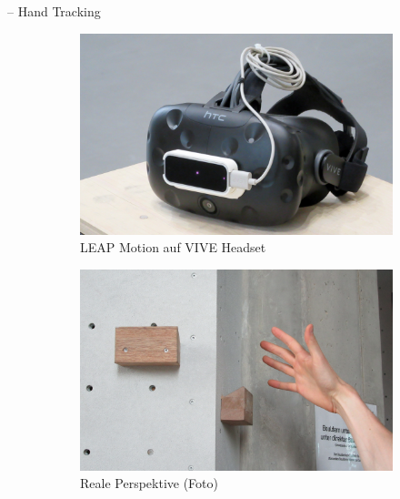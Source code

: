 \begin{frame}{\currentname{} -- Hand Tracking}
\begin{figure}
	\centering
	\begin{subfigure}[t]{0.32\textwidth}
		\centering
		\includegraphics[width=\textwidth]{include/images/leap-motion-overlay-setup.jpg}
		\caption{LEAP Motion auf VIVE Headset}
		\label{fig:leap-motion-setup}
	\end{subfigure}
	\hfill
	\begin{subfigure}[t]{0.32\textwidth}
		\centering
		\includegraphics[width=\textwidth]{include/images/leap-motion-overlay-photo.jpg}
		\caption{Reale Perspektive (Foto)}
		\label{fig:leap-motion-overlay-photo}
	\end{subfigure}
	\hfill
	\begin{subfigure}[t]{0.32\textwidth}
		\centering

\end{subfigure}
\end{figure}
\end{frame}

